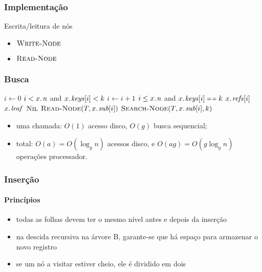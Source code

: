 \documentclass{beamer}
\begin{document}
\begin{frame}
\frametitle{Implementação}

Escrita/leitura de nós
\begin{itemize}
  \item $\textnormal{\scshape Write-Node}$
  \item $\textnormal{\scshape Read-Node}$
\end{itemize}

\end{frame}

\begin{frame}
\frametitle{Busca}

\begin{codebox}
\li $i \gets 0$
\li \While $i < \attrib{x}{n}$ and $\attrib{x}{keys}[i] < k$
\li \Do $i \gets i + 1$
    \End
\li \If $i \le \attrib{x}{n}$ and $\attrib{x}{keys}[i] \isequal k$
\li \Then \Return $\attrib{x}{refs}[i]$
    \End
\li \If $\attrib{x}{leaf}$
\li \Then \Return $\textnormal{\scshape Nil}$
    \End
\li $\proc{Read-Node}(T, \attrib{x}{sub}[i])$
\li \Return $\proc{Search-Node}(T, \attrib{x}{sub}[i], k)$
\end{codebox}

\pause
\begin{itemize}
\item uma chamada: $O(1)$ acesso disco, $O(g)$ busca sequencial;
\item total: $O(a) = O(\log_{g} n)$ acessos disco, e $O(ag) = O(g\log_g n)$ 
operações processador.
\end{itemize}
\end{frame}

\begin{frame}

\frametitle{Inserção}
\framesubtitle{Princípios}

\begin{itemize}
\item todas as folhas devem ter o mesmo nível antes e \alert{depois} da inserção
\item na descida recursiva na árvore B, garante-se que há espaço para armazenar o novo registro
\item se um nó a visitar estiver cheio, ele é \alert{dividido} em dois
\end{itemize}

\end{frame}
\end{document}
